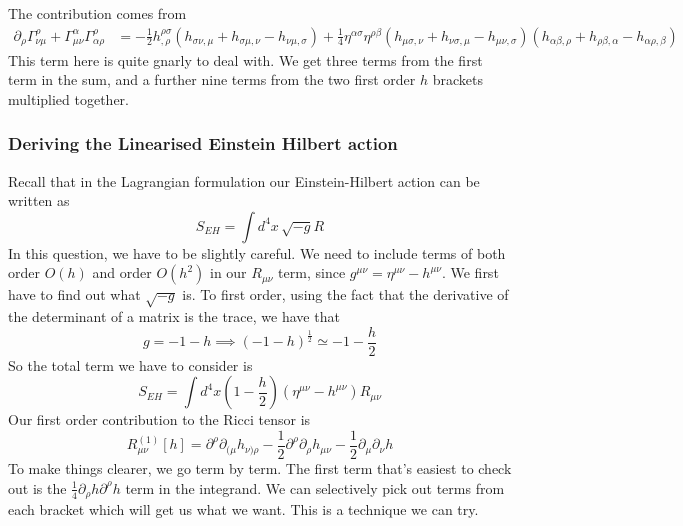 The contribution 
comes from 
\begin{align*}
\partial  _ \rho \Gamma ^ \rho_{ \nu \mu }  + \Gamma ^{ \alpha } _{ \mu \nu } \Gamma ^{ \rho } _{ \alpha \rho } &=   - \frac{1}{2 } h ^{ \rho \sigma } _{ , \rho } \left(  h _{ \sigma \nu , \mu } 
+ h _{ \sigma \mu , \nu }  - h _{ \nu \mu , \sigma } \right)  + 
\frac{1}{4 } \eta ^{ \alpha \sigma } \eta ^{ \rho \beta } \left(  
h_{ \mu \sigma , \nu } + h _{ \nu \sigma , \mu }  - h _{ \mu \nu , \sigma } \right)  \left( 
h_{ \alpha \beta, \rho } + h _{ \rho \beta , \alpha }  - h _{ \alpha \rho , \beta }  \right)  
\end{align*}
This term here is quite gnarly to deal with. 
We get three terms from the first term in the sum, 
and a further nine terms from the two first order $ h $ brackets multiplied together. 

\subsubsection{Deriving the Linearised Einstein Hilbert action} 
Recall that in the Lagrangian formulation 
our Einstein-Hilbert action can be written as 
\[
S_{ EH  } = \int d ^ 4 x \, \sqrt{  - g }  R 
\] In this question, 
we have to be slightly careful. 
We need to include terms of both order $ O \left(  h    \right) $ 
and order $ O \left( h ^ 2  \right)  $ in our $ R _{ \mu \nu } $ term, 
since $ g ^{ \mu \nu } = \eta ^{ \mu \nu }  - h ^{ \mu \nu } $. 
We first have to find out what $ \sqrt{  - g}  $ is.
To first order, using the fact that the derivative 
of the determinant of a matrix is the trace, we have that 
\[
g =   - 1  - h \implies \left( -1 - h  \right)^{ \frac{1}{2 } }  \simeq - 1  - \frac{h}{2 } 
\] So the total term 
we have to consider is 
\[
S_{ EH }  = \int d ^ 4 x \left( 1 - \frac{h}{2 } \right) 
\left( \eta^{ \mu \nu }  - h ^{ \mu \nu }  \right) R _{ \mu \nu } \] 
Our first order contribution to the 
Ricci tensor is 
\[
	R_{ \mu \nu } ^{ \left(  1  \right)  } \left[  h  \right]   = 
	\partial  ^ \rho \partial  _{ ( \mu } h _{ \nu  ) \rho 	  }  - 
	\frac{1}{2 } \partial  ^ \rho 	\partial  _ \rho h _{ \mu \nu } 
	 - \frac{1}{2 } \partial  _ \mu \partial  _ \nu h
\] To make things clearer, we go term by term.
The first term that's easiest to check out 
is the $  \frac{1}{4 }\partial  _ \rho h \partial  ^ \rho h  $ 
term in the integrand. We can 
selectively pick out terms from each bracket 
which will get us what we want. This is 
a technique we can try. 

\pagebreak 

